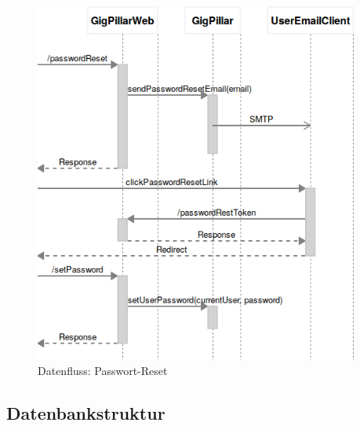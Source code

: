 %
%
%

\begin{figure}[!htb]
  \centering
  \includegraphics[width=0.95\textwidth]{konzept/datenfluss-passwort-reset.png}
  \caption{Datenfluss: Passwort-Reset}
\end{figure}

\clearpage
\subsection{Datenbankstruktur}\label{datenbankstruktur}

